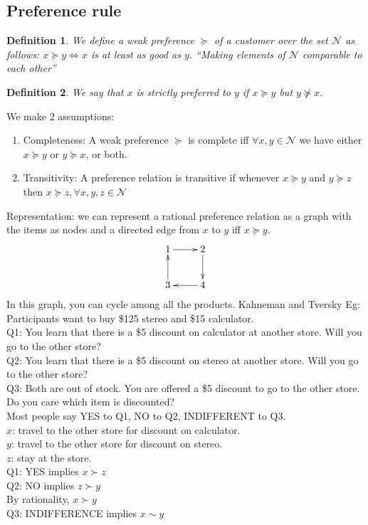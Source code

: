 \documentclass[11pt]{article}
\newtheorem{definition}{Definition}
\begin{document}
\subsection{Preference rule}
\begin{definition}
We define a weak preference $\succeq$ of a customer over the set $\mathcal{N}$ as follows:
$x \succeq y \iff x$ is at least as good as $y$.
``Making elements of $\mathcal{N}$ comparable to each other''
\end{definition}
\begin{definition}
We say that $x$ is strictly preferred to $y$ if $x \succeq y $ but $y \nsucceq x$.
\end{definition}

We make 2 assumptions:
\begin{enumerate}
\item Completeness: A weak preference $\succeq$ is complete iff $\forall x, y \in \mathcal{N}$ we have either $x \succeq y $ or $y \succeq x$, or both.
\item Transitivity: A preference relation is transitive if whenever $x \succeq y $ and $y \succeq z $ then $x \succeq z, \forall x,y,z \in \mathcal{N}$
\end{enumerate}
Representation: we can represent a rational preference relation as a graph with the items as nodes and a directed edge from $x$ to $y$ iff $x \succeq y $.
\begin{displaymath}
 \xymatrix{
1 \ar[r] &2\ar[d]\\
3  \ar[u] &4\ar[l]}
\end{displaymath}
In this graph, you can cycle among all the products.
Kahneman and Tversky
Eg: Participants want to buy \$125 stereo and \$15 calculator.\\
Q1: You learn that there is a \$5 discount on calculator at another store. Will you go to the other store?\\
Q2: You learn that there is a \$5 discount on stereo at another store. Will you go to the other store?\\
Q3: Both are out of stock. You are offered a \$5 discount to go to the other store. Do you care which item is discounted?\\
Most people say YES to Q1, NO to Q2, INDIFFERENT to Q3.\\
$x$: travel to the other store for discount on calculator.\\
$y$: travel to the other store for discount on stereo.\\
$z$: stay at the store.\\
Q1: YES implies $x \succ z$\\
Q2: NO implies $z \succ y$\\
By rationality, $x \succ y$\\
Q3: INDIFFERENCE implies $x \sim y$\\
\end{document}
